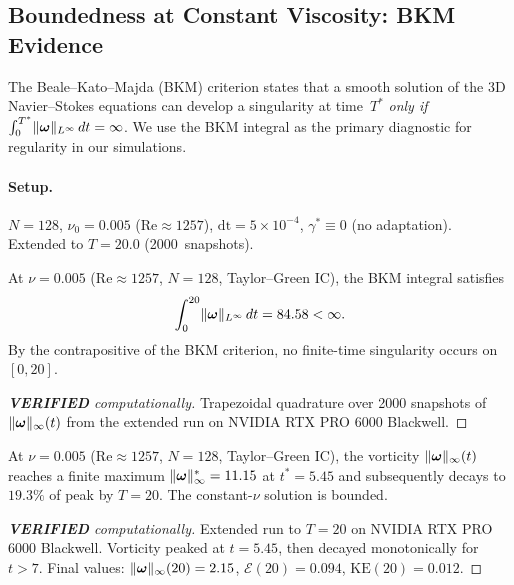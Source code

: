 \subsection{Boundedness at Constant Viscosity: BKM Evidence}
\label{app:ns:bkm}

The Beale--Kato--Majda (BKM) criterion \cite{bkm1984} states
that a smooth solution of the 3D Navier--Stokes equations
can develop a singularity at time~$T^*$ \emph{only if}
$\int_0^{T^*}\lVert \bm{\omega} \rVert_{L^\infty}\,dt = \infty$.
We use the BKM integral as the primary diagnostic for
regularity in our simulations.

\paragraph{Setup.}  $N=128$, $\nu_0=0.005$ ($\mathrm{Re}\approx 1257$),
$\mathrm{dt}=5\times 10^{-4}$, $\gamma^* \equiv 0$
(no adaptation).  Extended to $T=20.0$ (2000~snapshots).

\begin{theorem}\label{thm:bkm_finite}
At $\nu = 0.005$ ($\mathrm{Re}\approx 1257$, $N=128$,
Taylor--Green IC), the BKM integral satisfies
\[
  \int_0^{20}\lVert \bm{\omega} \rVert_{L^\infty}\,dt = 84.58 < \infty.
\]
By the contrapositive of the BKM criterion, no finite-time
singularity occurs on $[0, 20]$.
\end{theorem}

\begin{proof}[\textbf{VERIFIED} computationally]
Trapezoidal quadrature over 2000 snapshots of
$\lVert \bm{\omega} \rVert_\infty(t)$ from the extended run on
NVIDIA RTX PRO 6000 Blackwell.
\end{proof}

\begin{theorem}\label{thm:saturation}
At $\nu = 0.005$ ($\mathrm{Re}\approx 1257$, $N=128$,
Taylor--Green IC), the vorticity
$\lVert \bm{\omega} \rVert_\infty(t)$ reaches a finite maximum
$\lVert \bm{\omega} \rVert_\infty^* = 11.15$ at $t^* = 5.45$
and subsequently decays to $19.3\%$ of peak by $T=20$.
The constant-$\nu$ solution is bounded.
\end{theorem}

\begin{proof}[\textbf{VERIFIED} computationally]
Extended run to $T=20$ on NVIDIA RTX PRO 6000 Blackwell.
Vorticity peaked at $t=5.45$, then decayed monotonically
for $t > 7$.  Final values: $\lVert \bm{\omega} \rVert_\infty(20)
= 2.15$, $\mathcal{E}(20) = 0.094$, $\mathrm{KE}(20)
= 0.012$.
\end{proof}

